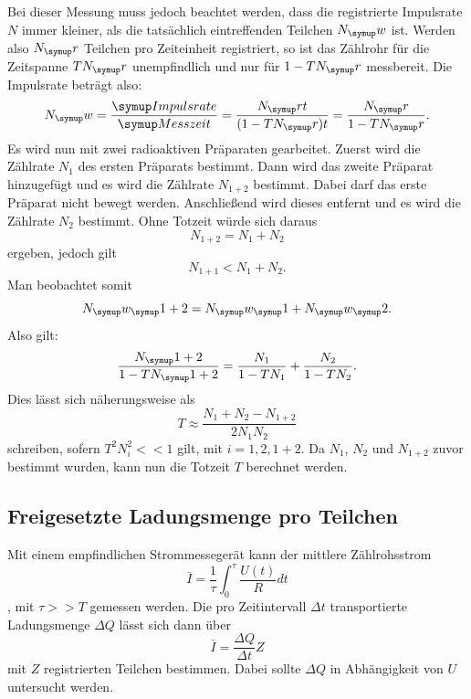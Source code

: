 Bei dieser Messung muss jedoch beachtet werden, dass die registrierte Impulsrate $N$
immer kleiner, als die tatsächlich eintreffenden Teilchen $N_\su{w}$ ist.
Werden also $N_\su{r}$ Teilchen pro Zeiteinheit registriert, so ist das Zählrohr für
die Zeitspanne $TN_\su{r}$ unempfindlich und nur für $1-TN_\su{r}$ messbereit.
Die Impulsrate beträgt also:
\begin{equation}
  N_\su{w} = \frac{\su{Impulsrate}}{\su{Messzeit}} = \frac{N_\su{r}t}{(1-TN_\su{r})t} =
  \frac{N_\su{r}}{1-TN_\su{r}}.
\end{equation}
Es wird nun mit zwei radioaktiven Präparaten gearbeitet. Zuerst wird die
Zählrate $N_1$ des ersten Präparats bestimmt. Dann wird das zweite Präparat hinzugefügt
und es wird die Zählrate $N_{1+2}$ bestimmt. Dabei darf das erste Präparat nicht bewegt
werden. Anschließend wird dieses entfernt und es wird die Zählrate $N_2$
bestimmt. Ohne Totzeit würde sich daraus
\begin{equation}
  N_{1+2} = N_1 + N_2
\end{equation}
ergeben, jedoch gilt
\begin{equation}
  N_{1+1} < N_1 + N_2.
\end{equation}
Man beobachtet somit
\begin{equation}
  N_\su{w_\su{1+2}} = N_\su{w_\su{1}} + N_\su{w_\su{2}}.
\end{equation}
Also gilt:
\begin{equation}
  \frac{N_\su{1+2}}{1-TN_\su{1+2}} = \frac{N_1}{1-TN_1} + \frac{N_2}{1-TN_2}.
\end{equation}
Dies lässt sich näherungsweise als
\begin{equation}
  T \approx \frac{N_1 + N_2 - N_{1+2}}{2N_1 N_2}
  \label{eqn:tot}
\end{equation}
schreiben, sofern $T^2N_i^2 << 1$ gilt, mit $ i = 1, 2, 1+2$.
Da $N_1$, $N_2$ und $N_{1+2}$ zuvor bestimmt wurden, kann nun die Totzeit $T$
berechnet werden.

\subsection{Freigesetzte Ladungsmenge pro Teilchen}
Mit einem empfindlichen Strommessegerät kann der mittlere Zählrohsstrom
\begin{equation}
  \bar{I} = \frac{1}{\tau} \int_0^{\tau} \frac{U(t)}{R}dt
\end{equation}
, mit $\tau >> T$ gemessen werden.
Die pro Zeitintervall $\Delta t$ transportierte Ladungsmenge $\Delta Q$
lässt sich dann über
\begin{equation}
  \bar{I} = \frac{\Delta Q} {\Delta t} Z
  \label{eqn:lad}
\end{equation}
mit $Z$ registrierten Teilchen bestimmen. Dabei sollte $\Delta Q$ in Abhängigkeit
von $U$ untersucht werden.
